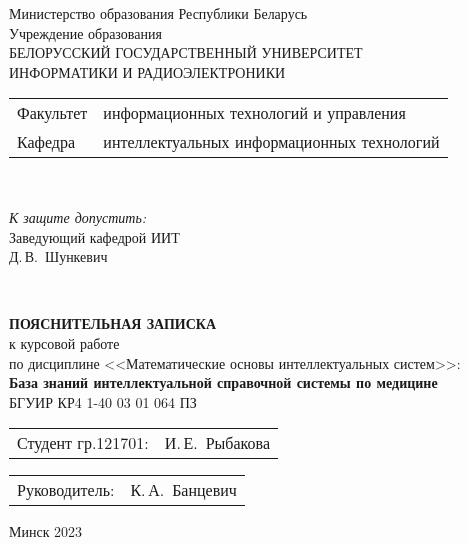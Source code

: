 \begin{titlepage}
	\begin{center}
		Министерство образования Республики Беларусь\\[1em]
		Учреждение образования\\
		БЕЛОРУССКИЙ ГОСУДАРСТВЕННЫЙ УНИВЕРСИТЕТ \\
		ИНФОРМАТИКИ И РАДИОЭЛЕКТРОНИКИ\\[1em]
		
		\begin{minipage}{\textwidth}
			\begin{flushleft}
				\begin{tabular}{ l l }
					Факультет & информационных технологий и управления\\
					Кафедра   & интеллектуальных информационных технологий
				\end{tabular}
			\end{flushleft}
		\end{minipage}\\[1em]
		
		\begin{flushright}
			\begin{minipage}{0.4\textwidth}
				\textit{К защите допустить:}\\[0.8em]
				Заведующий кафедрой ИИТ\\[0.45em]
				\underline{\hspace*{2.8cm}} Д.\,В.~Шункевич
			\end{minipage}\\[2.2em]
		\end{flushright}
		
		\textbf{ПОЯСНИТЕЛЬНАЯ ЗАПИСКА}\\
		{к курсовой работе}\\
		{по дисциплине <<Математические основы интеллектуальных систем>>:}\\[1em]
		\textbf{\large База знаний интеллектуальной справочной системы по медицине}\\[3em]
		
		
		{БГУИР КР4 1-40 03 01 064 ПЗ}\\[6em]
		\vspace{1em}
		\begin{tabular}{ p{}p{} }
			Студент гр.121701: & И.\,Е.~Рыбакова \\[1em]
			
		\end{tabular}
		\begin{tabular}{ p{}p{} }
			Руководитель: & К.\,А.~Банцевич \\[1em]
			
		\end{tabular}
		
		\vfill
		{\normalsize Минск 2023}
	\end{center}
\end{titlepage}
